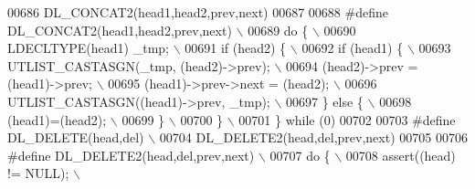 \begin{DoxyCode}
00686 \textcolor{preprocessor}{    DL\_CONCAT2(head1,head2,prev,next)}
00687 
00688 \textcolor{preprocessor}{#define DL\_CONCAT2(head1,head2,prev,next)                                                      \(\backslash\)}
00689 \textcolor{preprocessor}{do \{                                                                                           \(\backslash\)}
00690 \textcolor{preprocessor}{  LDECLTYPE(head1) \_tmp;                                                                       \(\backslash\)}
00691 \textcolor{preprocessor}{  if (head2) \{                                                                                 \(\backslash\)}
00692 \textcolor{preprocessor}{    if (head1) \{                                                                               \(\backslash\)}
00693 \textcolor{preprocessor}{        UTLIST\_CASTASGN(\_tmp, (head2)->prev);                                                  \(\backslash\)}
00694 \textcolor{preprocessor}{        (head2)->prev = (head1)->prev;                                                         \(\backslash\)}
00695 \textcolor{preprocessor}{        (head1)->prev->next = (head2);                                                         \(\backslash\)}
00696 \textcolor{preprocessor}{        UTLIST\_CASTASGN((head1)->prev, \_tmp);                                                  \(\backslash\)}
00697 \textcolor{preprocessor}{    \} else \{                                                                                   \(\backslash\)}
00698 \textcolor{preprocessor}{        (head1)=(head2);                                                                       \(\backslash\)}
00699 \textcolor{preprocessor}{    \}                                                                                          \(\backslash\)}
00700 \textcolor{preprocessor}{  \}                                                                                            \(\backslash\)}
00701 \textcolor{preprocessor}{\} while (0)}
00702 
00703 \textcolor{preprocessor}{#define DL\_DELETE(head,del)                                                                    \(\backslash\)}
00704 \textcolor{preprocessor}{    DL\_DELETE2(head,del,prev,next)}
00705 
00706 \textcolor{preprocessor}{#define DL\_DELETE2(head,del,prev,next)                                                         \(\backslash\)}
00707 \textcolor{preprocessor}{do \{                                                                                           \(\backslash\)}
00708 \textcolor{preprocessor}{  assert((head) != NULL);                                                                      \(\backslash\)}

\end{DoxyCode}
